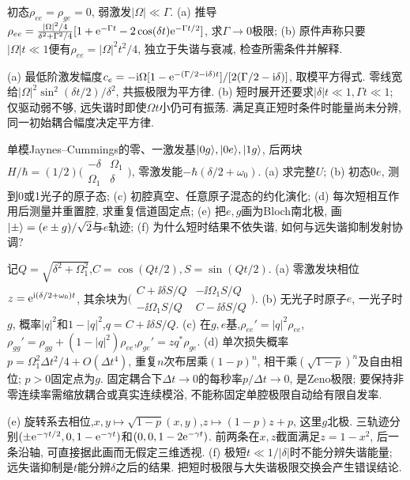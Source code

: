 \begin{exercise}初态$\rho_{ee}=\rho_{ge}=0$, 弱激发$|\Omega|\ll\Gamma$. (a) 推导$\rho_{ee}=\frac{|\Omega|^2/4}{\delta^2+\Gamma^2/4}[1+\mathrm e^{-\Gamma t}-2\cos(\delta t)\mathrm e^{-\Gamma t/2}]$, 求$\Gamma\to0$极限; (b) 原件声称只要$|\Omega|t\ll1$便有$\rho_{ee}=|\Omega|^2t^2/4$, 独立于失谐与衰减, 检查所需条件并解释.\end{exercise}
\begin{solution}(a) 最低阶激发幅度$c_e=-\mathrm i\Omega[1-\mathrm e^{-(\Gamma/2-\mathrm i\delta)t}]/[2(\Gamma/2-\mathrm i\delta)]$, 取模平方得式. 零线宽给$|\Omega|^2\sin^2(\delta t/2)/\delta^2$, 共振极限为平方律. (b) 短时展开还要求$|\delta|t\ll1,\Gamma t\ll1$; 仅驱动弱不够, 远失谐时即使$\Omega t$小仍可有振荡. 满足真正短时条件时能量尚未分辨, 同一初始耦合幅度决定平方律.
\end{solution}
\begin{exercise}单模Jaynes--Cummings的零、一激发基$\lvert 0g\rangle,\lvert 0e\rangle,\lvert 1g\rangle$, 后两块$H/\hbar=(1/2)\bigl(\begin{smallmatrix}-\delta&\Omega_1\\\Omega_1&\delta\end{smallmatrix}\bigr)$, 零激发能$-\hbar(\delta/2+\omega_0)$. (a) 求完整$U$; (b) 初态$0e$, 测到0或1光子的原子态; (c) 初腔真空、任意原子混态的约化演化; (d) 每次短相互作用后测量并重置腔, 求重复信道固定点; (e) 把$e,g$画为Bloch南北极, 画$\lvert \pm\rangle=(e\pm g)/\sqrt2$与$e$轨迹; (f) 为什么短时结果不依失谐, 如何与远失谐抑制发射协调?\end{exercise}
\begin{solution}记$Q=\sqrt{\delta^2+\Omega_1^2}$,$C=\cos(Qt/2),S=\sin(Qt/2)$. (a) 零激发块相位$z=\mathrm e^{\mathrm i(\delta/2+\omega_0)t}$, 其余块为$\bigl(\begin{smallmatrix}C+\ii\delta S/Q&-\ii\Omega_1S/Q\\-\ii\Omega_1S/Q&C-\ii\delta S/Q\end{smallmatrix}\bigr)$. (b) 无光子时原子$e$, 一光子时$g$, 概率$|q|^2$和$1-|q|^2$,$q=C+\ii\delta S/Q$. (c) 在$g,e$基,$\rho_{ee}'=|q|^2\rho_{ee}$,$\rho_{gg}'=\rho_{gg}+(1-|q|^2)\rho_{ee}$,$\rho_{ge}'=zq^*\rho_{ge}$. (d) 单次损失概率$p=\Omega_1^2\Delta t^2/4+O(\Delta t^4)$, 重复$n$次布居乘$(1-p)^n$, 相干乘$(\sqrt{1-p})^n$及自由相位; $p>0$固定点为$g$. 固定耦合下$\Delta t\to0$的每秒率$p/\Delta t\to0$, 是Zeno极限; 要保持非零连续率需缩放耦合或真实连续模浴, 不能称固定单腔极限自动给有限自发率.

(e) 旋转系去相位,$x,y\mapsto\sqrt{1-p}(x,y)$,$z\mapsto(1-p)z+p$, 这里$g$北极. 三轨迹分别$(\pm\mathrm e^{-\gamma t/2},0,1-\mathrm e^{-\gamma t})$和$(0,0,1-2\mathrm e^{-\gamma t})$. 前两条在$x,z$截面满足$z=1-x^2$, 后一条沿轴, 可直接据此画而无假定三维透视. (f) 极短$t\ll1/|\delta|$时不能分辨失谐能量; 远失谐抑制是$t$能分辨$\delta$之后的结果. 把短时极限与大失谐极限交换会产生错误结论.
\end{solution}
